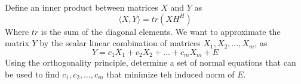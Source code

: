 \documentclass{homework}
\begin{document}
\begin{problem}[3-10]
Define an inner product between matrices $X$ and $Y$ as 
\[\langle X, Y\rangle = tr(XH^H)\]
Where $tr$ is the sum of the diagonal elements. We want to approximate the matrix $Y$ by the scalar linear combination of matrices $X_1, X_2, \dots, X_m$, as
\[ Y = c_1X_1 + c_2X_2 + \dots + c_mX_m + E\]
Using the orthogonality principle, determine a set of normal equations that can be used to find $c_1, c_2, \dots, c_m$ that minimize teh induced norm of $E$.
\end{problem}
\end{document}

